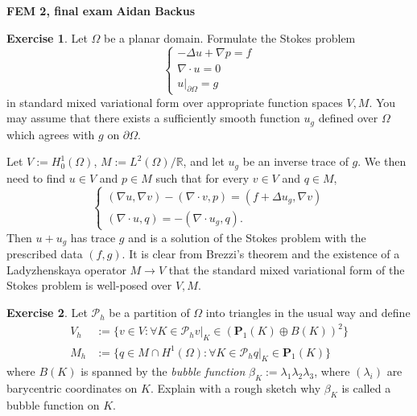 \documentclass[10pt]{article}
\newcommand{\RR}{\mathbb{R}}
\theoremstyle{definition}
\newtheorem{exer}{Exercise}
\begin{document}
\noindent
\large\textbf{FEM 2, final exam} \hfill \textbf{Aidan Backus} \\

\begin{exer}
Let $\Omega$ be a planar domain. Formulate the Stokes problem
$$
\begin{cases}
    -\Delta u + \nabla p = f \\
    \nabla \cdot u = 0 \\
    u|_{\partial \Omega} = g
\end{cases}
$$
in standard mixed variational form over appropriate function spaces $V, M$.
You may assume that there exists a sufficiently smooth function $u_g$ defined over $\Omega$ which agrees with $g$ on $\partial \Omega$.
\end{exer}

Let $V := H^1_0(\Omega)$, $M := L^2(\Omega)/\RR$, and let $u_g$ be an inverse trace of $g$.
We then need to find $u \in V$ and $p \in M$ such that for every $v \in V$ and $q \in M$,
$$
\begin{cases}
    (\nabla u, \nabla v) - (\nabla \cdot v, p) = (f + \Delta u_g, \nabla v) \\
    (\nabla \cdot u, q) = -(\nabla \cdot u_g, q).
\end{cases}
$$
Then $u + u_g$ has trace $g$ and is a solution of the Stokes problem with the prescribed data $(f, g)$.
It is clear from Brezzi's theorem and the existence of a Ladyzhenskaya operator $M \to V$ that the standard mixed variational form of the Stokes problem is well-posed over $V, M$.

\begin{exer}
Let $\mathcal P_h$ be a partition of $\Omega$ into triangles in the usual way and define
\begin{align*}
    V_h &:= \{v \in V: \forall K \in \mathcal P_h v|_K \in (\mathbf P_1(K) \oplus B(K))^2\} \\
    M_h &:= \{q \in M \cap H^1(\Omega): \forall K \in \mathcal P_h q|_K \in \mathbf P_1(K)\}
\end{align*}
where $B(K)$ is spanned by the \emph{bubble function} $\beta_K := \lambda_1 \lambda_2 \lambda_3$, where $(\lambda_i)$ are barycentric coordinates on $K$.
Explain with a rough sketch why $\beta_K$ is called a bubble function on $K$.
\end{exer}
\end{document}
